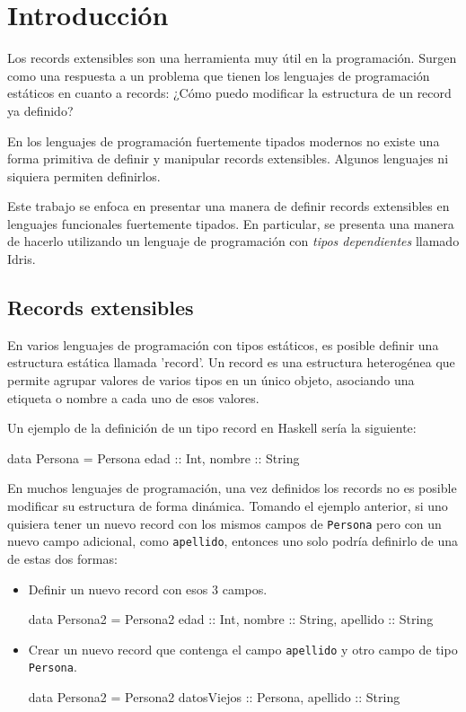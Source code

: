 
\chapter{Introducción}
\label{ch:1}

Los records extensibles son una herramienta muy útil en la programación. Surgen como una respuesta a un problema que tienen los lenguajes de programación estáticos en cuanto a records: ¿Cómo puedo modificar la estructura de un record ya definido?

En los lenguajes de programación fuertemente tipados modernos no existe una forma primitiva de definir y manipular records extensibles. Algunos lenguajes ni siquiera permiten definirlos.

Este trabajo se enfoca en presentar una manera de definir records extensibles en lenguajes funcionales fuertemente tipados. En particular, se presenta una manera de hacerlo utilizando un lenguaje de programación con \textit{tipos dependientes} llamado Idris.

\section{Records extensibles}

En varios lenguajes de programación con tipos estáticos, es posible definir una estructura estática llamada 'record'. Un record es una estructura heterogénea que permite agrupar valores de varios tipos en un único objeto, asociando una etiqueta o nombre a cada uno de esos valores.

Un ejemplo de la definición de un tipo record en Haskell sería la siguiente:

\begin{code}
data Persona = Persona { edad :: Int, nombre :: String }
\end{code}

En muchos lenguajes de programación, una vez definidos los records no es posible modificar su estructura de forma dinámica. Tomando el ejemplo anterior, si uno quisiera tener un nuevo record con los mismos campos de \texttt{Persona} pero con un nuevo campo adicional, como \texttt{apellido}, entonces uno solo podría definirlo de una de estas dos formas:

\begin{itemize}[noitemsep]
\item Definir un nuevo record con esos 3 campos.
\begin{code}
data Persona2 = Persona2 {
  edad :: Int,
  nombre :: String,
  apellido :: String
}
\end{code}
\item Crear un nuevo record que contenga el campo \texttt{apellido} y otro campo de tipo \texttt{Persona}.
\begin{code}
data Persona2 = Persona2 {
  datosViejos :: Persona,
  apellido :: String
}
\end{code}
\end{itemize}

